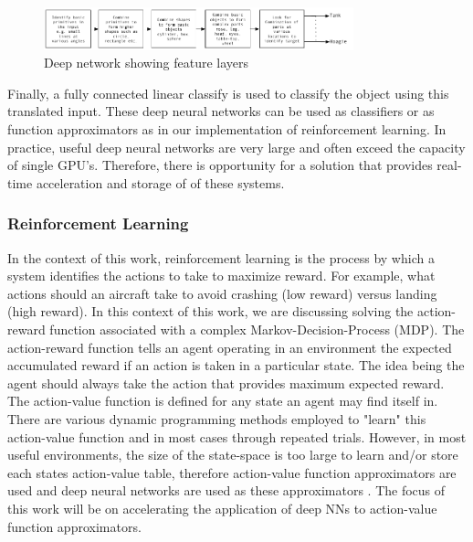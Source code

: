 \begin{figure}[hbtp]
\centering
\includegraphics[width=0.8\textwidth]{Chapter-1/figs/deepNetworkBlockDiagram}
\captionsetup{justification=centering, skip=5pt}
\caption{Deep network showing feature layers}
\label{fig:Deep network showing feature layers}
\end{figure}
Finally, a fully connected linear classify is used to classify the object using this translated input.
These deep neural networks can be used as classifiers or as function approximators as in our implementation of reinforcement learning.
In practice, useful deep neural networks are very large and often exceed the capacity of single GPU's. Therefore,  there is opportunity for a solution that provides
real-time acceleration and storage of of these systems.

\fi


\iftrue

\subsubsection*{Reinforcement Learning}
In the context of this work, reinforcement learning is the process by which a system identifies the actions to take to maximize reward.
For example, what actions should an aircraft take to avoid crashing (low reward) versus landing (high reward).
In this context of this work, we are discussing solving the action-reward function associated with a complex Markov-Decision-Process (MDP).
The action-reward function tells an agent operating in an environment the expected accumulated reward if an action is taken
in a particular state. The idea being the agent should always take the action that provides maximum expected reward.
The action-value function is defined for any state an agent may find itself in.
There are various dynamic programming methods employed to "learn" this action-value function and in most cases through repeated trials.
However, in most useful environments, the size of the state-space is too large to learn and/or store each states action-value table, therefore action-value function
approximators are used and deep neural networks are used as these approximators \cite{mnih2013playing}.
The focus of this work will be on accelerating the application of deep NNs to action-value function approximators.

\fi



